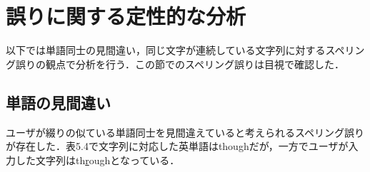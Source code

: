\begin{comment}
\subsubsection{アルファベットに対する数字のスペリング誤り}
表5.1にはその事例を示していて，ユーザがタイピングゲームにおいて英単語ideaを入力するときにユーザが入力した文字列が13ideaであった場合があった．これはそれぞれiと1，dと3の視覚的混同によって起きたものであると考えられる．しかし英単語を入力するという設定のタイピングゲームにおいて，数字を入力することは考えにくい．しかしタイピングゲームではハイスコアを競う設定がされているので，競うようなユーザが焦るような状況においては，視覚的混同のようなスペリング誤りを引き起こす要因が高まると考えられる．
\end{comment}

\begin{comment}
表5.3と表5.4は上位10件の置換前の文字と置換後の文字のペアを示している．表5.3と表5.4を比較すると，表5.3においてxとc，vとc，jとhなど隣接するキー配置による打鍵誤りからもたらされるスペリング誤りが10件中8件見られ，表5.4ではzとs，xとsのような打鍵誤りからもたらされるスペリング誤りが10件中4件見られタイピングゲームを用いたスペリング誤りと通常のスペリング誤りで違いが見られた．表5.3においてbとvの置換もよく見られ，このスペリング誤りの原因は打鍵誤りによるものと日本人特有のローマ字の使用による影響と考えられるが，同じくローマ字の使用による影響によって起きるrとlの置換は表5.1に示すように本研究においてはあまり起こらなかったため，タイピングゲームのような表示された文字を書き写す状況ではローマ字の使用による影響をあまり受けず，打鍵誤りにより引き起こされる置換が通常のスペリング誤りに比べよく起きることが示唆された．
\end{comment}

\section{誤りに関する定性的な分析}

以下では単語同士の見間違い，同じ文字が連続している文字列に対するスペリング誤りの観点で分析を行う．この節でのスペリング誤りは目視で確認した．

\subsection{単語の見間違い}
ユーザが綴りの似ている単語同士を見間違えていると考えられるスペリング誤りが存在した．表5.4で文字列に対応した英単語はthoughだが，一方でユーザが入力した文字列はth\underline{r}oughとなっている．
\begin{comment}
これは本研究のようにユーザが入力しようとしている文字列がわからなければ抽出できない事例である．
またWheelerの研究\cite{wheeler1970processes}において人間は単語を文字や音素のような要素を逐次処理することで認識するのではなく，分けられない単体として認識している可能性があることが指摘されており，この事例はそれに伴った結果であると考えられる．
\end{comment}


